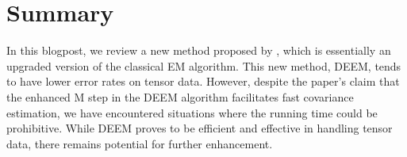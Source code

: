\documentclass[11pt]{article}
\begin{document}
\section{Summary}

In this blogpost, we review a new method proposed by \cite{mai2022DEEM}, which is essentially an upgraded version of the classical EM algorithm. This new method, DEEM, tends to have lower error rates on tensor data. However, despite the paper's claim that the enhanced M step in the DEEM algorithm facilitates fast covariance estimation, we have encountered situations where the running time could be prohibitive. While DEEM proves to be efficient and effective in handling tensor data, there remains potential for further enhancement.

\begin{singlespace}
	
	
\end{singlespace}
\end{document}
